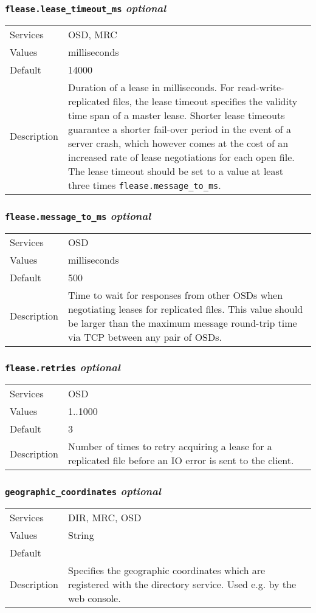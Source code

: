 \documentclass[a4paper,10pt]{book}
\begin{document}
\subsubsection{\texttt{flease.lease\_timeout\_ms} \textit{optional}}
\begin{tabular}{lp{10cm}}
 Services & OSD, MRC\\
 Values   & milliseconds \\
 Default  & 14000 \\
 Description & Duration of a lease in milliseconds. For read-write-replicated files, the lease timeout specifies the validity time span of a master lease. Shorter lease timeouts guarantee a shorter fail-over period in the event of a server crash, which however comes at the cost of an increased rate of lease negotiations for each open file. The lease timeout should be set to a value at least three times \texttt{flease.message\_to\_ms}.
\end{tabular}

\subsubsection{\texttt{flease.message\_to\_ms} \textit{optional}}
\begin{tabular}{lp{10cm}}
 Services & OSD\\
 Values   & milliseconds \\
 Default  & 500 \\
 Description & Time to wait for responses from other OSDs when negotiating leases for replicated files. This value should be larger than the maximum message round-trip time via TCP between any pair of OSDs.
\end{tabular}

\subsubsection{\texttt{flease.retries} \textit{optional}}
\begin{tabular}{lp{10cm}}
 Services & OSD\\
 Values   & 1..1000 \\
 Default  & 3 \\
 Description & Number of times to retry acquiring a lease for a replicated file before an IO error is sent to the client.
\end{tabular}

\subsubsection{\texttt{geographic\_coordinates} \textit{optional}}
\begin{tabular}{lp{10cm}}
 Services & DIR, MRC, OSD\\
 Values   & String \\
 Default  & \\
 Description & Specifies the geographic coordinates which are registered with the directory service. Used e.g. by the web console.
\end{tabular}
\end{document}
